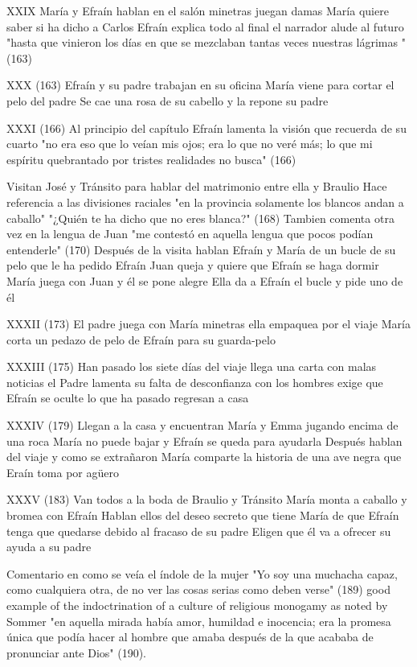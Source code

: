 XXIX
María y Efraín hablan en el salón minetras juegan damas
María quiere saber si ha dicho a Carlos
Efraín explica todo
al final el narrador alude al futuro "hasta que vinieron los días en que se mezclaban tantas veces nuestras lágrimas " (163)

XXX (163)
Efraín y su padre trabajan en su oficina
María viene para cortar el pelo del padre
Se cae una rosa de su cabello y la repone su padre 

XXXI (166)
Al principio del capítulo Efraín lamenta la visión que recuerda de su cuarto "no era eso que lo veían mis ojos; era lo que no veré más; lo que mi espíritu quebrantado por tristes realidades no busca" (166)

Visitan José y Tránsito para hablar del matrimonio entre ella y Braulio
Hace referencia a las divisiones raciales "en la provincia solamente los blancos andan a caballo" "¿Quién te ha dicho que no eres blanca?" (168)
Tambien comenta otra vez en la lengua de Juan "me contestó en aquella lengua que pocos podían entenderle" (170)
Después de la visita hablan Efraín y María de un bucle de su pelo que le ha pedido Efraín
Juan queja y quiere que Efraín se haga dormir
María juega con Juan y él se pone alegre
Ella da a Efraín el bucle y pide uno de él 

XXXII (173)
El padre juega con María minetras ella empaquea por el viaje
María corta un pedazo de pelo de Efraín para su guarda-pelo

XXXIII (175)
Han pasado los siete días del viaje
llega una carta con malas noticias
el Padre lamenta su falta de desconfianza con los hombres
exige que Efraín se oculte lo que ha pasado
regresan a casa

XXXIV (179)
Llegan a la casa y encuentran María y Emma jugando encima de una roca
María no puede bajar y Efraín se queda para ayudarla
Después hablan del viaje y como se extrañaron
María comparte la historia de una ave negra que Eraín toma por agüero

XXXV (183)
Van todos a la boda de Braulio y Tránsito 
María monta a caballo y bromea con Efraín
Hablan ellos del deseo secreto que tiene María de que Efraín tenga que quedarse debido al fracaso de su padre
Eligen que él va a ofrecer su ayuda a su padre

Comentario en como se veía el índole de la mujer "Yo soy una muchacha capaz, como cualquiera otra, de no ver las cosas serias como deben verse" (189)
good example of the indoctrination of a culture of religious monogamy as noted by Sommer "en aquella mirada había amor, humildad e inocencia; era la promesa única que podía hacer al hombre que amaba después de la que acababa de pronunciar ante Dios" (190).

